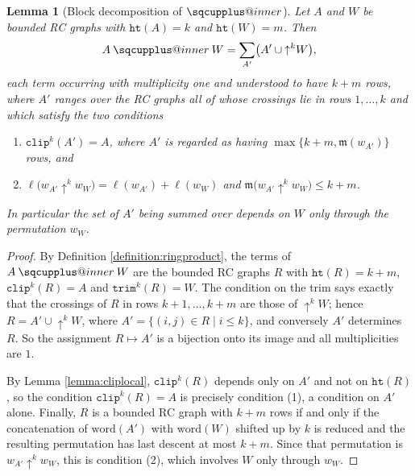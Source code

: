 \documentclass{amsart}
\makeatletter
\newcommand{\sqcupplus@inner}[2]{%
  \vcenter{\hbox{\ooalign{%
    \hfil$\m@th#1\sqcup$\hfil\cr
    \hfil\raisebox{0.15ex}{$\m@th#1\scriptscriptstyle+$}\hfil\cr
  }}}%
}
\newcommand{\sqcupplus}{\mathbin{\mathpalette\sqcupplus@inner\relax}}
\newtheorem{lemma}{Lemma}[subsection]
\theoremstyle{definition}
\theoremstyle{remark}
\numberwithin{equation}{subsection}
\newcommand{\shup}{{\uparrow}}
\newcommand{\wof}[1]{w_{#1}}
\newcommand{\trm}{\mathtt{trim}}
\newcommand{\hr}{\mathtt{ht}}
\newcommand{\clp}{\mathtt{clip}}
\newcommand{\maxd}{\mathfrak{m}}
\makeatother
\begin{document}
\begin{lemma}[Block decomposition of $\sqcupplus$]\label{lemma:blockdecomp}
Let $A$ and $W$ be bounded RC graphs with $\hr(A)=k$ and $\hr(W)=m$. Then
$$A\sqcupplus W=\sum_{A'}\bigl(A'\cup\shup^{k}W\bigr),$$
each term occurring with multiplicity one and understood to have $k+m$ rows, where $A'$ ranges over the RC graphs all of whose crossings lie in rows $1,\ldots,k$ and which satisfy the two conditions
\begin{enumerate}
\item $\clp^{k}(A')=A$, where $A'$ is regarded as having $\max\{k+m,\maxd(\wof{A'})\}$ rows, and
\item $\ell\bigl(\wof{A'}\shup^{k}\wof W\bigr)=\ell(\wof{A'})+\ell(\wof W)$ and $\maxd\bigl(\wof{A'}\shup^{k}\wof W\bigr)\leq k+m$.
\end{enumerate}
In particular the set of $A'$ being summed over depends on $W$ only through the permutation $\wof W$.
\end{lemma}
\begin{proof}
By Definition \ref{definition:ringproduct}, the terms of $A\sqcupplus W$ are the bounded RC graphs $R$ with $\hr(R)=k+m$, $\clp^{k}(R)=A$ and $\trm^{k}(R)=W$. The condition on the trim says exactly that the crossings of $R$ in rows $k+1,\ldots,k+m$ are those of $\shup^{k}W$; hence $R=A'\cup\shup^{k}W$, where $A'=\{(i,j)\in R\mid i\leq k\}$, and conversely $A'$ determines $R$. So the assignment $R\mapsto A'$ is a bijection onto its image and all multiplicities are $1$.

By Lemma \ref{lemma:cliplocal}, $\clp^{k}(R)$ depends only on $A'$ and not on $\hr(R)$, so the condition $\clp^{k}(R)=A$ is precisely condition (1), a condition on $A'$ alone. Finally, $R$ is a bounded RC graph with $k+m$ rows if and only if the concatenation of $\mathrm{word}(A')$ with $\mathrm{word}(W)$ shifted up by $k$ is reduced and the resulting permutation has last descent at most $k+m$. Since that permutation is $\wof{A'}\shup^{k}\wof{W}$, this is condition (2), which involves $W$ only through $\wof W$.
\end{proof}
\end{document}
